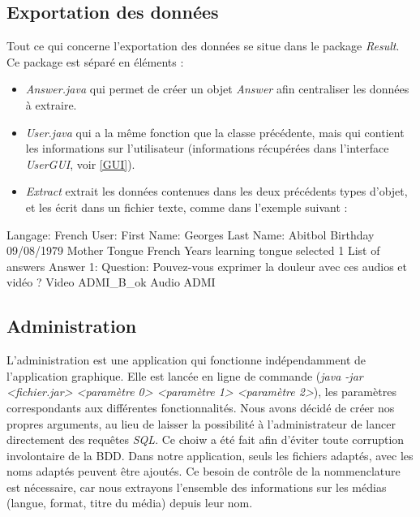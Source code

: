 \subsection{Exportation des données}\label{export}

Tout ce qui concerne l'exportation des données se situe dans le package \textit{Result}. Ce package est séparé en 
 éléments :
 
 \begin{itemize}
  \item \textit{Answer.java} qui permet de créer un objet \textit{Answer} afin centraliser les données à extraire.
  \item \textit{User.java} qui a la même fonction que la classe précédente, mais qui contient les informations sur l'utilisateur (informations récupérées dans l'interface \textit{UserGUI}, voir \ref{GUI}).
  \item \textit{Extract} extrait les données contenues dans les deux précédents types d'objet, et les écrit dans un fichier texte, comme dans l'exemple suivant :
 \end{itemize}
 
 \begin{verbnobox}[\small]
  Langage:   French
  User:
      First Name:   Georges
      Last Name:   Abitbol
      Birthday   09/08/1979
      Mother Tongue   French
      Years learning tongue selected   1
  List of answers
      Answer 1:
	    Question:   Pouvez-vous exprimer la douleur avec ces audios et vidéo ?
	    Video   ADMI_B_ok
	    Audio   ADMI

 \end{verbnobox}
 
 
\subsection{Administration}\label{fonction_admi}

L'administration est une application qui fonctionne indépendamment de l'application graphique.
Elle est lancée en ligne de commande (\textit{java -jar <fichier.jar> <paramètre 0> <paramètre 1> <paramètre 2>}), les paramètres correspondants aux différentes fonctionnalités.
Nous avons décidé de créer nos propres arguments, au lieu de laisser la possibilité à l'administrateur de lancer directement des requêtes \textit{SQL}. Ce choiw a été fait afin d'éviter toute corruption involontaire de la BDD. Dans notre application, seuls les fichiers adaptés, avec les noms adaptés peuvent être ajoutés.
Ce besoin de contrôle de la nommenclature est nécessaire, car nous extrayons l'ensemble des informations sur les médias (langue, format, titre du média) depuis leur nom.


